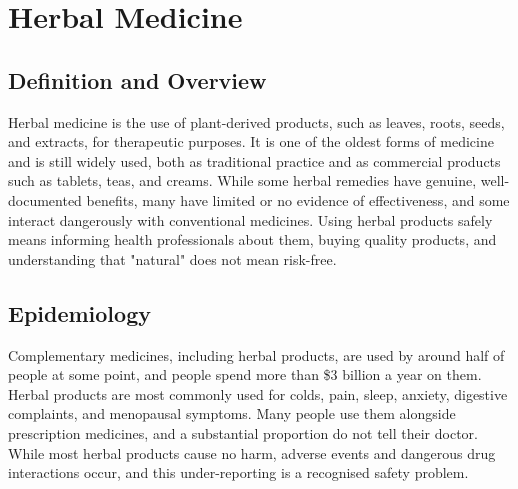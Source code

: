 \chapter{Herbal Medicine}

\section*{Definition and Overview}
Herbal medicine is the use of plant-derived products, such as leaves, roots, seeds, and extracts, for therapeutic purposes. It is one of the oldest forms of medicine and is still widely used, both as traditional practice and as commercial products such as tablets, teas, and creams. While some herbal remedies have genuine, well-documented benefits, many have limited or no evidence of effectiveness, and some interact dangerously with conventional medicines. Using herbal products safely means informing health professionals about them, buying quality products, and understanding that "natural" does not mean risk-free.

\section*{Epidemiology}
Complementary medicines, including herbal products, are used by around half of people at some point, and people spend more than \$3 billion a year on them. Herbal products are most commonly used for colds, pain, sleep, anxiety, digestive complaints, and menopausal symptoms. Many people use them alongside prescription medicines, and a substantial proportion do not tell their doctor. While most herbal products cause no harm, adverse events and dangerous drug interactions occur, and this under-reporting is a recognised safety problem.

